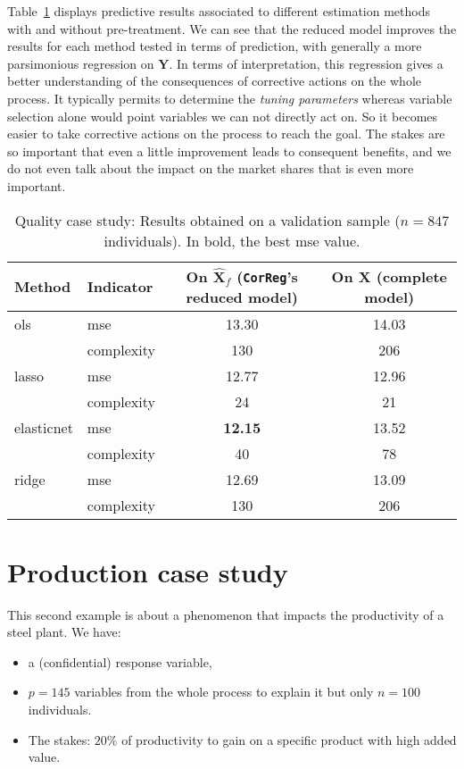\documentclass[12pt,a4paper]{report}
\begin{document}
\vspace{3mm}
	
	
Table~\ref{Res_exfos} displays predictive results associated to different estimation methods with and without pre-treatment. We can see that the reduced model improves the results for each method tested in terms of prediction, with generally a more parsimonious regression on $\boldsymbol{Y}$. In terms of interpretation, this regression gives a better understanding of the consequences of corrective actions on the whole process. It typically permits to determine the \textit{tuning parameters} whereas variable selection alone would point variables we can not directly act on.	So it becomes easier to take corrective actions on the process to reach the goal. The stakes are so important that even a little improvement leads to consequent benefits, and we do not even talk about the impact on the market shares that is even more important.
		

		\begin{table}[h!]
\centering
\begin{tabular}{llcc}
	\hline
	Method& Indicator& On $\hat{\boldsymbol{X}}_f$ ({\tt CorReg}'s reduced model)& On $\boldsymbol{X}$ (complete model) \\ 
	\hline \hline
	{\sc ols} & {\sc mse} & 13.30 & 14.03 \\
		& complexity& 130 & 206 \\
	\hline
	{\sc lasso} & {\sc mse} & 12.77 & 12.96 \\
		& complexity& 24 & 21 \\
	\hline
	elasticnet & {\sc mse} & \textbf{12.15} & 13.52 \\
		& complexity& 40 & 78 \\
	\hline
	ridge & {\sc mse} & 12.69 & 13.09 \\
		& complexity& 130 & 206 \\
	\hline
\end{tabular} 
\caption{Quality case study: Results obtained on a validation sample ($n=847$ individuals). In bold, the best {\sc mse} value.}\label{Res_exfos}
\end{table}


		\FloatBarrier
		\section{Production case study}\label{sectionBV}
This second example is about a phenomenon that impacts the productivity of a steel plant.
We have:
		\begin{itemize}
			\item a (confidential)  response variable,
			\item $p=145$ variables from the whole process to explain it but only $n=100$ individuals.
			\item The stakes: $20\%$ of productivity to gain on a specific product with high added value.
		\end{itemize}
		
\end{document}
